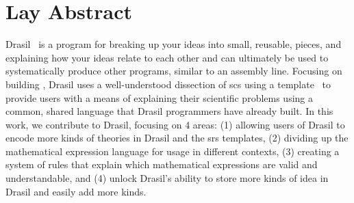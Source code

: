 \chapter{Lay Abstract}
\label{chap:lay_abstract}

Drasil~\cite{Drasil2021} is a program for breaking up your ideas into small,
reusable, pieces, and explaining how your ideas relate to each other and can
ultimately be used to systematically produce other programs, similar to an
assembly line. Focusing on building , Drasil uses a well-understood
dissection of \acs{scs} using a  template~\cite{SmithAndLai2005} to
provide users with a means of explaining their scientific problems using a
common, shared language that Drasil programmers have already built. In this
work, we contribute to Drasil, focusing on 4 areas: (1) allowing users of Drasil
to encode more kinds of theories in Drasil and the \acs{srs} templates, (2)
dividing up the mathematical expression language for usage in different
contexts, (3) creating a system of rules that explain which mathematical
expressions are valid and understandable, and (4) unlock Drasil's ability to
store more kinds of idea in Drasil and easily add more kinds.
